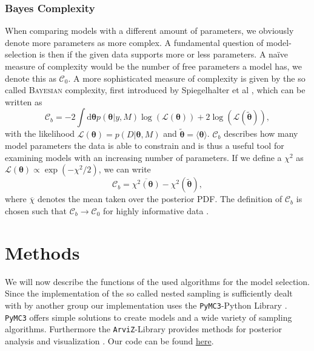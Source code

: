 \documentclass[%
 reprint,
 amsmath,amssymb,
 aps,
]{revtex4-1}
\begin{document}
\subsubsection{\textbf{Bayes Complexity}}
When comparing models with a different amount of parameters, we obviously denote more parameters as more complex. A fundamental question of model-selection is then if the given data supports more or less parameters. A na\"ive measure of complexity would be the number of free parameters a model has, we denote this as $\mathcal{C}_0$. A more sophisticated measure of complexity is given by the so called \textsc{Bayesian} complexity, first introduced by Spiegelhalter et al \cite{Spiegelhalter}, which can be written as \cite{kunz} 
\begin{equation}\label{eq:Bayes_Complexity}
	\mathcal{C}_b=-2\int \text{d}\boldsymbol{\theta} p(\boldsymbol{\theta}|y,M)\log(\mathcal{L}(\boldsymbol{\theta}))+2\log(\mathcal{L}(\boldsymbol{\tilde{\theta}})),
\end{equation}
with  the likelihood $\mathcal{L}(\boldsymbol{\theta})=p(D|\boldsymbol{\theta},M)$ and $\boldsymbol{\tilde{\theta}}=\langle\boldsymbol{\theta}\rangle$. $\mathcal{C}_b$ describes how many model parameters the data is able to constrain \cite{kunz} and is thus a useful tool for examining models with an increasing number of parameters. If we define a $\chi^2$ as $\mathcal{L}(\boldsymbol{\theta})\propto \exp(-\chi^2/2)$, we can write 
\begin{equation}\label{eq:Bayes_Complexity_alt}
	\mathcal{C}_b=\overline{\chi^2(\boldsymbol{\theta})}-\chi^2(\boldsymbol{\tilde{\theta}}),
\end{equation}
where $\overline{\chi}$ denotes the mean taken over the posterior PDF. 
The definition of $\mathcal{C}_b$ is chosen such that $\mathcal{C}_b\to\mathcal{C}_0$ for highly informative data \cite{kunz}.

\section{Methods}\label{sec:meth}
\noindent We will now describe the functions of the used algorithms for the model selection. Since the implementation of the so called nested sampling is sufficiently dealt with by another group \cite{paramter_fit} our implementation uses the \texttt{PyMC3}-Python Library \cite{PyMC3}.  \texttt{PyMC3} offers simple solutions to create models and a wide variety of sampling algorithms. Furthermore the \texttt{ArviZ}-Library provides methods for posterior analysis and visualization \cite{ArviZ}. Our code can be found \hyperref{https://github.com/dschuechter/physics760_schuechter_krause}{Github-Repository}{Bayes model selection}{here}.
\end{document}
